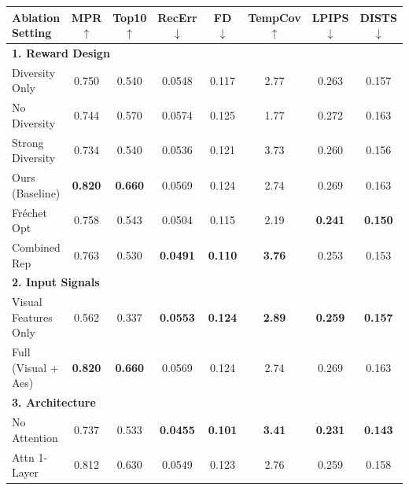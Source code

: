 \begin{table}[t]
\centering
\scriptsize
\setlength{\tabcolsep}{3pt}
\renewcommand{\arraystretch}{1.1}
\begin{tabular}{@{} l c c c c c c c @{}}
\toprule
\textbf{Ablation Setting} & \textbf{MPR} $\uparrow$ & \textbf{Top10} $\uparrow$ & \textbf{RecErr} $\downarrow$ & \textbf{FD} $\downarrow$ & \textbf{TempCov} $\uparrow$ & \textbf{LPIPS} $\downarrow$ & \textbf{DISTS} $\downarrow$ \\
\midrule
\multicolumn{8}{l}{\textbf{1. Reward Design}} \\
\hspace{3mm} Diversity Only & 0.750 & 0.540 & 0.0548 & 0.117 & 2.77 & 0.263 & 0.157 \\
\hspace{3mm} No Diversity & 0.744 & 0.570 & 0.0574 & 0.125 & 1.77 & 0.272 & 0.163 \\
\hspace{3mm} Strong Diversity & 0.734 & 0.540 & 0.0536 & 0.121 & 3.73 & 0.260 & 0.156 \\
\rowcolor{gray!15} \hspace{3mm} Ours (Baseline) & \textbf{0.820} & \textbf{0.660} & 0.0569 & 0.124 & 2.74 & 0.269 & 0.163 \\
\hspace{3mm} Fréchet Opt & 0.758 & 0.543 & 0.0504 & 0.115 & 2.19 & \textbf{0.241} & \textbf{0.150} \\
\hspace{3mm} Combined Rep & 0.763 & 0.530 & \textbf{0.0491} & \textbf{0.110} & \textbf{3.76} & 0.253 & 0.153 \\
\midrule
\multicolumn{8}{l}{\textbf{2. Input Signals}} \\
\hspace{3mm} Visual Features Only & 0.562 & 0.337 & \textbf{0.0553} & \textbf{0.124} & \textbf{2.89} & \textbf{0.259} & \textbf{0.157} \\
\hspace{3mm} Full (Visual + Aes) & \textbf{0.820} & \textbf{0.660} & 0.0569 & 0.124 & 2.74 & 0.269 & 0.163 \\
\midrule
\multicolumn{8}{l}{\textbf{3. Architecture}} \\
\hspace{3mm} No Attention & 0.737 & 0.533 & \textbf{0.0455} & \textbf{0.101} & \textbf{3.41} & \textbf{0.231} & \textbf{0.143} \\
\hspace{3mm} Attn 1-Layer & 0.812 & 0.630 & 0.0549 & 0.123 & 2.76 & 0.259 & 0.158 \\

\end{tabular}
\end{table}
